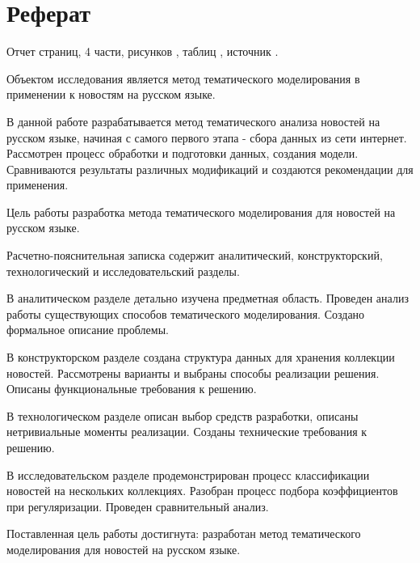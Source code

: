 \chapter*{Реферат}

Отчет страниц, 4 части, \todo{} рисунков\todo{} , \todo{} таблиц\todo{} , \todo{} источник\todo{} .

Объектом исследования является метод тематического моделирования в применении к новостям на русском языке.

В данной работе разрабатывается метод тематического анализа новостей на русском языке, начиная с самого первого этапа - сбора данных из сети интернет. Рассмотрен процесс обработки и подготовки данных, создания модели. Сравниваются результаты различных модификаций и создаются рекомендации для применения.

Цель работы разработка метода тематического моделирования для новостей на русском языке.

Расчетно-пояснительная записка содержит аналитический, конструкторский, технологический и исследовательский разделы.

В аналитическом разделе детально изучена предметная область. Проведен анализ работы существующих способов тематического моделирования. Создано формальное описание проблемы.

В конструкторском разделе создана структура данных для хранения коллекции новостей. Рассмотрены варианты и выбраны способы реализации решения. Описаны функциональные требования к решению.

В технологическом разделе описан выбор средств разработки, описаны нетривиальные моменты реализации. Созданы технические требования к решению.

В исследовательском разделе продемонстрирован процесс классификации новостей на нескольких коллекциях. Разобран процесс подбора коэффициентов при регуляризации. Проведен сравнительный анализ.

Поставленная цель работы достигнута: разработан метод тематического моделирования для новостей на русском языке.